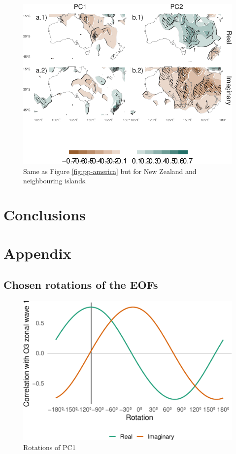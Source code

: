 \documentclass[smallextended]{svjour3}       %
\begin{document}
\begin{figure}
\centering
\includegraphics{../figures/pp-oceania-1.pdf}
\caption{\label{fig:pp-oceania}Same as Figure \ref{fig:pp-america} but for New Zealand and neighbouring islands.}
\end{figure}

\hypertarget{conclusions}{%
\section{Conclusions}\label{conclusions}}

\hypertarget{appendix}{%
\section{Appendix}\label{appendix}}

\hypertarget{chosen-rotations-of-the-eofs}{%
\subsection{Chosen rotations of the EOFs}\label{chosen-rotations-of-the-eofs}}

\begin{figure}
\centering
\includegraphics{../figures/rotations-pc1-1.pdf}
\caption{\label{fig:rotations-pc1}Rotations of PC1}
\end{figure}
\end{document}
